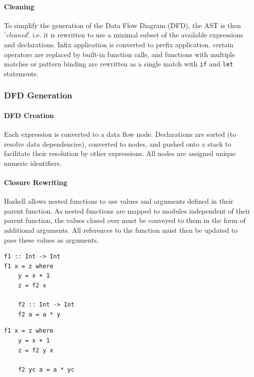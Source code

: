 \documentclass[english,onecolumn]{article}
\begin{document}
\paragraph{Cleaning}
To simplify the generation of the Data Flow Diagram (DFD), the AST is then '\textit{cleaned}'. i.e. it is rewritten to use a minimal subset of the available expressions and declarations. Infix application is converted to prefix application, certain operators are replaced by built-in function calls, and functions with multiple matches or pattern binding are rewritten as a single match with \lstinline{if} and \lstinline{let} statements.

\subsubsection{DFD Generation}
\paragraph{DFD Creation}
Each expression is converted to a data flow node. Declarations are sorted (to resolve data dependencies), converted to nodes, and pushed onto a stack to facilitate their resolution by other expressions. All nodes are assigned unique numeric identifiers.

\paragraph{Closure Rewriting}
Haskell allows nested functions to use values and arguments defined in their parent function. As nested functions are mapped to modules independent of their parent function, the values closed over must be conveyed to them in the form of additional arguments.
All references to the function must then be updated to pass these values as arguments.

\begin{lstlisting}[caption={A nested function with a closure.}, label=lst:closure]
f1 :: Int -> Int
f1 x = z where
    y = x + 1
    z = f2 x

    f2 :: Int -> Int
    f2 a = a * y
\end{lstlisting}

\begin{lstlisting}[caption={The function from Listing \ref{lst:closure}, rewritten to use arguments.}]
f1 x = z where
    y = x + 1
    z = f2 y x

    f2 yc a = a * yc
\end{lstlisting}
\end{document}
